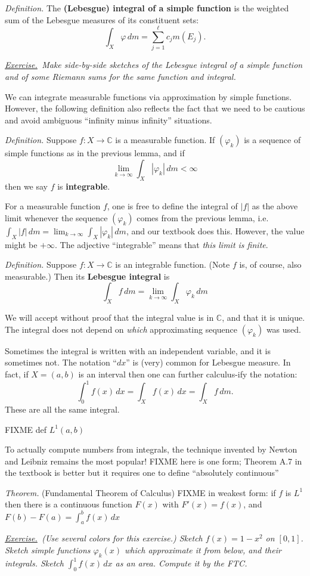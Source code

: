 \documentclass[12pt]{article}
\newcommand{\CC}{\mathbb{C}}
\newcommand{\defin}{\emph{Definition.}\,\,}
\newcommand{\thm}{\emph{Theorem.}\,\,}
\newcommand{\exer}[2]{\emph{\underline{Exercise.}\, #2} \vspace*{#1mm}}
\begin{document}
\defin The \textbf{(Lebesgue) integral of a simple function} is the weighted sum of the Lebesgue measures of its constituent sets:
	$$\boxed{\int_X \varphi\,dm = \sum_{j=1}^\ell c_j m(E_j)}.$$

\clearpage\newpage
\exer{50}{Make side-by-side sketches of the Lebesgue integral of a simple function and of some Riemann sums for the same function and integral.}

We can integrate measurable functions via approximation by simple functions.  However, the following definition also reflects the fact that we need to be cautious and avoid ambiguous ``infinity minus infinity'' situations.

\defin Suppose $f:X\to\CC$ is a measurable function.  If $(\varphi_k)$ is a sequence of simple functions as in the previous lemma, and if
    $$\lim_{k\to\infty} \int_X |\varphi_k|\,dm < \infty$$
then we say $f$ is \textbf{integrable}.

For a measurable function $f$, one is free to define the integral of $|f|$ as the above limit whenever the sequence $(\varphi_k)$ comes from the previous lemma, i.e.~$\int_X |f|\,dm = \lim_{k\to\infty} \int_X |\varphi_k|\,dm$, and our textbook does this.  However, the value might be $+\infty$.  The adjective ``integrable'' means that \emph{this limit is finite}.

\defin Suppose $f:X\to\CC$ is an integrable function.  (Note $f$ is, of course, also measurable.)  Then its \textbf{Lebesgue integral} is
    $$\boxed{\int_X f\,dm = \lim_{k\to\infty} \int_X \varphi_k\,dm}$$

We will accept without proof that the integral value is in $\CC$, and that it is unique.  The integral does not depend on \emph{which} approximating sequence $(\varphi_k)$ was used.

Sometimes the integral is written with an independent variable, and it is sometimes not.  The notation ``$dx$'' is (very) common for Lebesgue measure.  In fact, if $X=(a,b)$ is an interval then one can further calculus-ify the notation:
    	$$\int_0^1 f(x)\,dx = \int_X f(x)\,dx = \int_X f\,dm.$$
These are all the same integral.

FIXME def $L^1(a,b)$

To actually compute numbers from integrals, the technique invented by Newton and Leibniz remains the most popular!  FIXME here is one form; Theorem A.7 in the textbook is better but it requires one to define ``absolutely continuous''

\thm (Fundamental Theorem of Calculus)  FIXME in weakest form: if $f$ is $L^1$ then there is a continuous function $F(x)$ with $F'(x)=f(x)$, and $F(b) - F(a) = \int_a^b f(x)\,dx$ 

\exer{60}{(Use several colors for this exercise.)  Sketch $f(x)=1-x^2$ on $[0,1]$.  Sketch simple functions $\varphi_k(x)$ which approximate it from below, and their integrals.  Sketch $\int_0^1 f(x)\,dx$ as an area.  Compute it by the FTC.}
\end{document}
